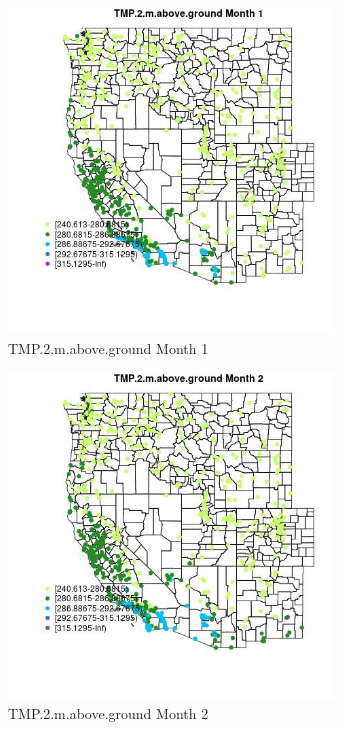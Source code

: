 \begin{figure} 
\centering  
\includegraphics[width=0.77\textwidth]{Code_Outputs/Report_ML_input_PM25_Step4_part_f_de_duplicated_aveswNAs_MapObsMo1TMP2maboveground.jpg} 
\caption{\label{fig:Report_ML_input_PM25_Step4_part_f_de_duplicated_aveswNAsMapObsMo1TMP2maboveground}TMP.2.m.above.ground Month 1} 
\end{figure} 
 

\begin{figure} 
\centering  
\includegraphics[width=0.77\textwidth]{Code_Outputs/Report_ML_input_PM25_Step4_part_f_de_duplicated_aveswNAs_MapObsMo2TMP2maboveground.jpg} 
\caption{\label{fig:Report_ML_input_PM25_Step4_part_f_de_duplicated_aveswNAsMapObsMo2TMP2maboveground}TMP.2.m.above.ground Month 2} 
\end{figure} 
 

